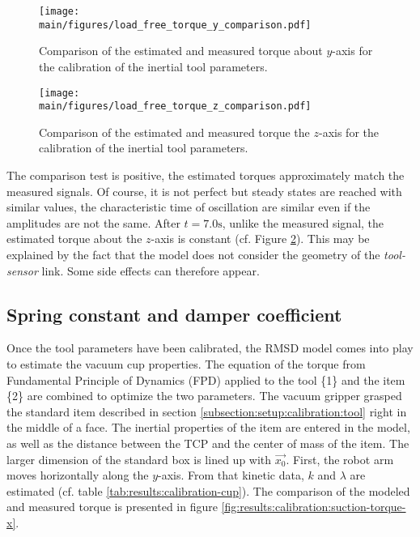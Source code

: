 \documentclass[/home/francois/latex/report/main.tex]{subfiles}
\begin{document}
\begin{figure}[H]
  \centering
  \texttt{[image: \\main/figures/load\_free\_torque\_y\_comparison.pdf]}
  \caption{Comparison of the estimated and measured torque about $y$-axis for the calibration of the inertial tool parameters.}
  \label{fig:results:torque-y}
\end{figure}

\begin{figure}[H]
  \centering
  \texttt{[image: \\main/figures/load\_free\_torque\_z\_comparison.pdf]}
  \caption{Comparison of the estimated and measured torque the $z$-axis for the calibration of the inertial tool parameters.}
  \label{fig:results:torque-z}
\end{figure}

The comparison test is positive, the estimated torques approximately match the measured signals. Of course, it is not perfect but steady states are reached with similar values, the characteristic time of oscillation are similar even if the amplitudes are not the same. After $t = 7.0 \si{\second}$, unlike the measured signal, the estimated torque about the $z$-axis is constant (cf. Figure \ref{fig:results:torque-z}). This may be explained by the fact that the model does not consider the geometry of the \textit{tool-sensor} link. Some side effects can therefore appear.

\subsection{Spring constant and damper coefficient}

Once the tool parameters have been calibrated, the \ac{RMSD} model comes into play to estimate the vacuum cup properties. The equation of the torque from Fundamental Principle of Dynamics (FPD) applied to the tool \{1\} and the item \{2\} are combined to optimize the two parameters. The vacuum gripper grasped the standard item described in section \ref{subsection:setup:calibration:tool} right in the middle of a face. The inertial properties of the item are entered in the model, as well as the distance between the \ac{TCP} and the center of mass of the item. The larger dimension of the standard box is lined up with $\overrightarrow{x_0}$. First, the robot arm moves horizontally along the $y$-axis. From that kinetic data, $k$ and $\lambda$ are estimated (cf. table \ref{tab:results:calibration-cup}). The comparison of the modeled and measured torque is presented in figure \ref{fig:results:calibration:suction-torque-x}.
\end{document}

